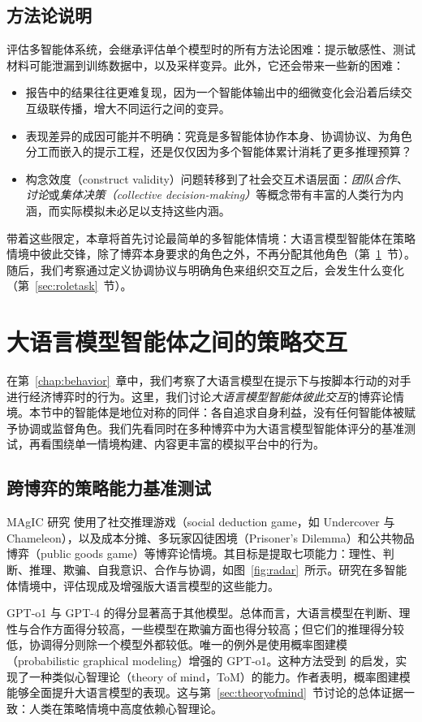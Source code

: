 \subsection{方法论说明}
评估多智能体系统，会继承评估单个模型时的所有方法论困难：提示敏感性、测试材料可能泄漏到训练数据中，以及采样变异。此外，它还会带来一些新的困难：
\begin{itemize}
    \item 报告中的结果往往更难复现，因为一个智能体输出中的细微变化会沿着后续交互级联传播，增大不同运行之间的变异。
    \item 表现差异的成因可能并不明确：究竟是多智能体协作本身、协调协议、为角色分工而嵌入的提示工程，还是仅仅因为多个智能体累计消耗了更多推理预算？
    \item 构念效度（construct validity）问题转移到了社会交互术语层面：{\em 团队合作}、{\em 讨论}或{\em 集体决策（collective decision-making）}等概念带有丰富的人类行为内涵，而实际模拟未必足以支持这些内涵。
\end{itemize}
带着这些限定，本章将首先讨论最简单的多智能体情境：大语言模型智能体在策略情境中彼此交锋，除了博弈本身要求的角色之外，不再分配其他角色（第~\ref{sec:strat}~节）。随后，我们考察通过定义协调协议与明确角色来组织交互之后，会发生什么变化（第~\ref{sec:roletask}~节）。

\section{大语言模型智能体之间的策略交互} \label{sec:strat}
在第~\ref{chap:behavior}~章中，我们考察了大语言模型在提示下与按脚本行动的对手进行经济博弈时的行为。这里，我们讨论{\em 大语言模型智能体彼此交互}的博弈论情境。本节中的智能体是地位对称的同伴：各自追求自身利益，没有任何智能体被赋予协调或监督角色。我们先看同时在多种博弈中为大语言模型智能体评分的基准测试，再看围绕单一情境构建、内容更丰富的模拟平台中的行为。

\subsection{跨博弈的策略能力基准测试}
MAgIC 研究 \citep{xu2024magic} 使用了社交推理游戏（social deduction game，如 Undercover 与 Chameleon），以及成本分摊、多玩家囚徒困境（Prisoner's Dilemma）和公共物品博弈（public goods game）等博弈论情境。其目标是提取七项能力：理性、判断、推理、欺骗、自我意识、合作与协调，如图~\ref{fig:radar}~所示。研究在多智能体情境中，评估现成及增强版大语言模型的这些能力。

GPT-o1 与 GPT-4 的得分显著高于其他模型。总体而言，大语言模型在判断、理性与合作方面得分较高，一些模型在欺骗方面也得分较高；但它们的推理得分较低，协调得分则除一个模型外都较低。唯一的例外是使用概率图建模（probabilistic graphical modeling）增强的 GPT-o1。这种方法受到 \citet{kollerfriendman2009pgm} 的启发，实现了一种类似心智理论（theory of mind，ToM）的能力。作者表明，概率图建模能够全面提升大语言模型的表现。这与第~\ref{sec:theoryofmind}~节讨论的总体证据一致：人类在策略情境中高度依赖心智理论。

